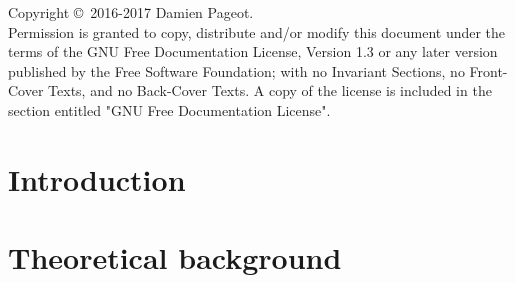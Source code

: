 \documentclass{gnulike}
\begin{document}

\null\vfill
{}
\noindent Copyright \copyright\ 2016-2017 Damien Pageot.\\

\noindent Permission is granted to copy, distribute and/or modify this document under the terms of the GNU Free Documentation License, Version 1.3 or any later version published by the Free Software Foundation; with no Invariant Sections, no Front-Cover Texts, and no Back-Cover Texts. A copy of the license is included in the section entitled "GNU Free Documentation License".
\clearpage\newpage

\tableofcontents
\thispagestyle{empty}
\clearpage\newpage

\chapter{Introduction}

\chapter{Theoretical background}
\end{document}
